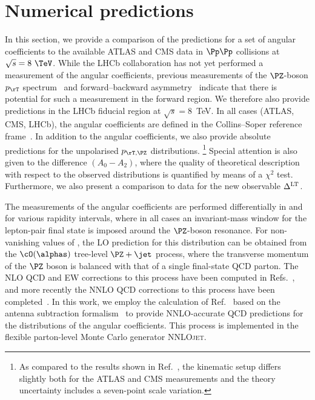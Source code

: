
\section{Numerical predictions} 
\label{sec3}

In this section, we provide a comparison of the predictions for a set of angular coefficients
to the available ATLAS and CMS data in $\Pp\Pp$ collisions at $\sqrt{s} = 8~\TeV$. 
While the LHCb collaboration has not yet performed a measurement of the
angular coefficients, previous measurements of the $\PZ$-boson $p_\rT$ 
spectrum~\cite{Aaij:2015gna,Aaij:2015zlq,Aaij:2016mgv}
and forward--backward asymmetry~\cite{Aaij:2015lka} indicate that there is potential for such
a measurement in the forward region. We therefore also provide predictions
in the LHCb fiducial region at $\sqrt{s} = 8$~TeV. In all cases (ATLAS, CMS, LHCb), the angular coefficients 
are defined in the Collins--Soper reference frame~\cite{Collins:1977iv}.
%
In addition to the angular coefficients, we also provide absolute predictions for the unpolarised $\ptz$ distributions.%
\footnote{As compared to the results shown in Ref.~\cite{Ridder:2016nkl}, the kinematic setup differs slightly 
both for the ATLAS and CMS measurements and the theory uncertainty includes a seven-point scale variation.}
Special attention is also given to the difference $(A_0-A_2)$, 
where the quality of theoretical description with respect to the observed distributions is 
quantified by means of a $\chi^2$ test.
%
Furthermore, we also present a comparison to data for the new observable $\Delta^{\rm LT}$.

The measurements of the angular coefficients are performed differentially in \ptz and for various rapidity 
intervals, where in all cases an invariant-mass window for the lepton-pair final state is imposed around 
the $\PZ$-boson resonance. 
%
For non-vanishing values of \ptz, the LO prediction for this distribution can be obtained
from the $\cO(\alphas)$ tree-level $\PZ+\jet$ process, where the transverse 
momentum of the $\PZ$ boson is balanced with that of a single final-state QCD parton. 
%
The NLO QCD and EW corrections to this process have been computed in Refs.~\cite{Giele:1993dj,Denner:2011vu}, and
more recently the NNLO QCD corrections to this process have been completed~\cite{Ridder:2015dxa,Boughezal:2015ded}.
%
In this work, we employ the calculation of Ref.~\cite{Ridder:2015dxa} based on the antenna
subtraction formalism~\cite{GehrmannDeRidder:2005cm,GehrmannDeRidder:2005aw,GehrmannDeRidder:2005hi,Daleo:2006xa,Daleo:2009yj,Boughezal:2010mc,Gehrmann:2011wi,GehrmannDeRidder:2012ja,Currie:2013vh}
to provide NNLO-accurate QCD predictions for the \ptz distributions of the angular coefficients.
This process is implemented in the flexible parton-level Monte Carlo generator \textsc{NNLOjet}.

